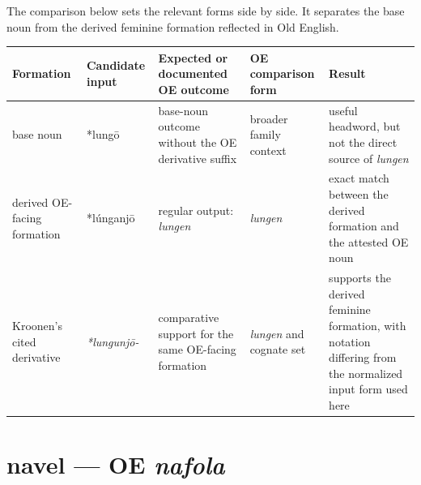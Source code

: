 \documentclass[
  british,
  a4paper,
  openany]{book}
\newcounter{none} %
\providecommand{\texorpdfstring}[2]{#1}
\begin{document}
The comparison below sets the relevant forms side by side. It separates
the base noun from the derived feminine formation reflected in Old
English.

{\def\LTcaptype{none} %
\begin{longtable}[]{@{}
  >{\raggedright\arraybackslash}p{}
  >{\raggedright\arraybackslash}p{}
  >{\raggedright\arraybackslash}p{}
  >{\raggedright\arraybackslash}p{}
  >{\raggedright\arraybackslash}p{}@{}}
\toprule\noalign{}
\begin{minipage}[b]{\linewidth}\raggedright
Formation
\end{minipage} & \begin{minipage}[b]{\linewidth}\raggedright
Candidate input
\end{minipage} & \begin{minipage}[b]{\linewidth}\raggedright
Expected or documented OE outcome
\end{minipage} & \begin{minipage}[b]{\linewidth}\raggedright
OE comparison form
\end{minipage} & \begin{minipage}[b]{\linewidth}\raggedright
Result
\end{minipage} \\
\midrule\noalign{}
\endhead
\bottomrule\noalign{}
\endlastfoot
base noun & *lungō & base-noun outcome without the OE derivative suffix
& broader family context & useful headword, but not the direct source of
\emph{lungen} \\
derived OE-facing formation & *lúnganjō & regular output: \emph{lungen}
& \emph{lungen} & exact match between the derived formation and the
attested OE noun \\
Kroonen's cited derivative & \emph{*lungunjō-} & comparative support for
the same OE-facing formation & \emph{lungen} and cognate set & supports
the derived feminine formation, with notation differing from the
normalized input form used here \\
\end{longtable}
}

\section{\texorpdfstring{navel --- OE
\emph{nafola}}{navel --- OE nafola}}\label{navel-oe-nafola}
\end{document}
